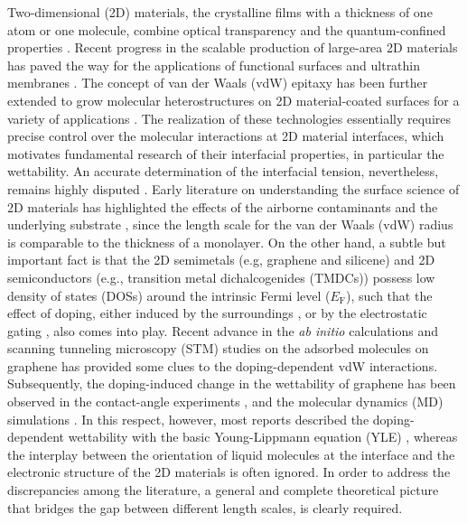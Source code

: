 \documentclass[journal=jacsat,manuscript=article,email=true]{achemso}
\begin{document}
Two-dimensional (2D) materials, the crystalline films with a thickness
of one atom or one molecule, combine optical transparency and the
quantum-confined properties
\cite{Novoselov_2005,Mas_Ballest__2011,Novoselov_2016}.  Recent progress in the scalable production of large-area 2D
materials \cite{Boott_2015,Li_2016} has paved the way for the
applications of functional surfaces and ultrathin membranes
\cite{Prasai_2012,Feng_2016,Rafiee_2010,Yin_2014,Surwade_2015,Hern_ndez_2013}.
The concept of van der Waals (vdW) epitaxy has been further extended
to grow molecular heterostructures on 2D material-coated surfaces for
a variety of applications
\cite{Shi_2012_epitaxy_graphene,Kim_2017_remote_epitaxy,Novoselov_2016}. The
realization of these technologies essentially requires precise control
over the molecular interactions at 2D material interfaces, which
motivates fundamental research of their interfacial properties, in
particular the wettability.  An accurate determination of the
interfacial tension, nevertheless, remains highly disputed
\cite{taherian2013what,Kozbial_2015,Parobek_2015,Govind_Rajan_2016}. Early
literature on understanding the surface science of 2D materials has
highlighted the effects of the airborne contaminants
\cite{li_effect_2013,Xu_2013_withwhat,kozbial_study_2014,Kozbial_2015,Chow_2015}
and the underlying substrate
\cite{raj_wettability_2013,rafiee_wetting_2012,shih_breakdown_2012,shih_wetting_2013},
since the length scale for the van der Waals (vdW) radius is
comparable to the thickness of a monolayer. On the other hand, a
subtle but important fact is that the 2D semimetals (e.g, graphene and
silicene) and 2D semiconductors (e.g., transition metal
dichalcogenides (TMDCs)) possess low density of states (DOSs) around
the intrinsic Fermi level (\(E_{\mathrm{F}}\)), such that the effect of
doping, either induced by the surroundings
\cite{Chen_2013,Varchon_2007,Giovannetti_2008}, or by the electrostatic
gating \cite{Das_2008,Perera_2013}, also comes into play. Recent advance
in the \textit{ab initio} calculations and scanning tunneling
microscopy (STM) studies on the adsorbed molecules on graphene
\cite{Muruganathan_2015,Huttmann_2015} has provided some clues to the
doping-dependent vdW interactions. Subsequently, the doping-induced
change in the wettability of graphene has been observed in the
contact-angle experiments
\cite{hong_mechanism_2016,goniszewski_correlation_2016,ashraf_doping-induced_2016},
and the molecular dynamics (MD) simulations
\cite{ostrowski_tunable_2014,ren_interfacial_2015,Taherian_2015,daub_electrowetting_2007}. In
this respect, however, most reports described the doping-dependent
wettability with the basic Young-Lippmann equation (YLE)
\cite{Lippmann_1875}, whereas the interplay between the orientation of
liquid molecules at the interface \cite{Shen_2006} and the electronic
structure of the 2D materials is often ignored. In order to address
the discrepancies among the literature, a general and complete
theoretical picture that bridges the gap between different length
scales, is clearly required.
\end{document}
